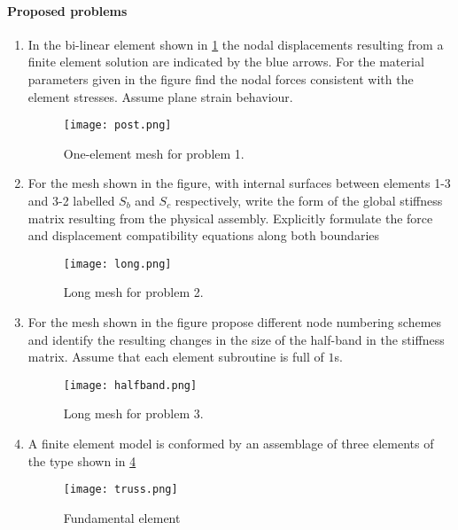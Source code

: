\paragraph*{Proposed problems}
\begin{enumerate}

\item \label{punto01} In the bi-linear element shown in \cref{fig:onemesh} the nodal displacements resulting from a finite element solution are indicated by the blue arrows. For the material parameters given in the figure find the nodal forces consistent with the element stresses. Assume plane strain behaviour.


\begin{figure}[H]
\centering
\texttt{[image: post.png]} 
\caption{One-element mesh for problem 1.}
\label{fig:onemesh}
\end{figure}


\item \label{punto02} For the mesh shown in the figure, with internal surfaces between elements 1-3 and 3-2 labelled $S_b$ and $S_c$ respectively, write the form of the global stiffness matrix resulting from the physical assembly. Explicitly formulate the force and displacement compatibility equations along both boundaries


\begin{figure}[H]
\centering
\texttt{[image: long.png]} 
\caption{Long mesh for problem 2.}
\label{fig:longmesh}
\end{figure}

\item \label{punto03} For the mesh shown in the figure propose different node numbering schemes and identify the resulting changes in the size of the half-band in the stiffness matrix. Assume that each element subroutine is full of $1$s.

\begin{figure}[H]
\centering
\texttt{[image: halfband.png]} 
\caption{Long mesh for problem 3.}
\label{fig:halfmesh}
\end{figure}



\item \label{punto04} A finite element model is conformed by an assemblage of three elements of the type shown in \cref{fig:cercha}


\begin{figure}[H]
\centering
\texttt{[image: truss.png]} 
\caption{Fundamental element}
\label{fig:cercha}
\end{figure}


\end{enumerate}
